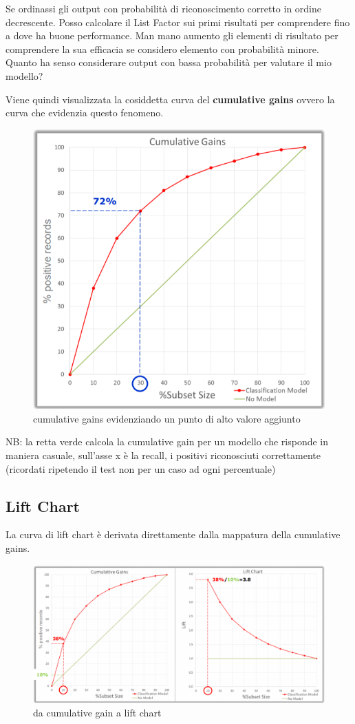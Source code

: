 Se ordinassi gli output con probabilit\`a di riconoscimento corretto in ordine decrescente. Posso calcolare il List Factor sui primi risultati per comprendere fino a dove ha buone performance. Man mano aumento gli elementi di risultato per comprendere la sua efficacia se considero elemento con probabilit\`a minore. Quanto ha senso considerare output con bassa probabilit\`a per valutare il mio modello?

Viene quindi visualizzata la cosiddetta curva del \textbf{cumulative gains} ovvero la curva che evidenzia questo fenomeno.
\begin{figure}[h!]
	\centering
	\includegraphics[height=0.6 \linewidth]{pict/cumulative_gains.png}
	\caption{cumulative gains evidenziando un punto di alto valore aggiunto}
\end{figure}

NB: la retta verde calcola la cumulative gain per un modello che risponde in maniera casuale, sull'asse x \`e la recall, i positivi riconosciuti correttamente (ricordati ripetendo il test non per un caso ad ogni percentuale)

\subsection{Lift Chart}
La curva di lift chart \`e derivata direttamente dalla mappatura della cumulative gains.

\begin{figure}[h!]
	\centering
	\includegraphics[height=0.45 \linewidth]{pict/lift_chart.png}
	\caption{da cumulative gain a lift chart}
\end{figure}

